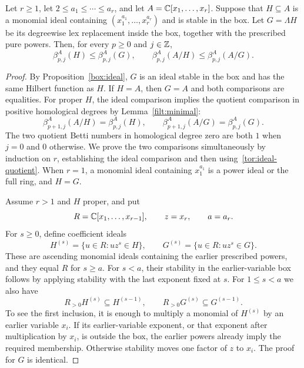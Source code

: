 \begin{theorem}
\label{tor:stable}
Let $r\ge1$, let $2\le a_1\le\cdots\le a_r$, and let
$A=\mathbb C[x_1,\ldots,x_r]$.  Suppose that $H\subseteq A$ is a
monomial ideal containing $(x_1^{a_1},\ldots,x_r^{a_r})$ and is
stable in the box.  Let $G=\Lambda H$ be its degreewise lex
replacement inside the box, together with the prescribed pure powers.
Then, for every $p\ge0$ and $j\in\mathbb Z$,
\[
 \beta^A_{p,j}(H)\le\beta^A_{p,j}(G),
 \qquad
 \beta^A_{p,j}(A/H)\le\beta^A_{p,j}(A/G).
\]
\end{theorem}

\begin{proof}
By Proposition~\ref{box:ideal}, $G$ is an ideal stable in the box
and has the same Hilbert function as $H$.  If $H=A$, then $G=A$
and both comparisons are equalities.  For proper $H$, the ideal
comparison implies the quotient comparison in positive homological
degrees by Lemma~\ref{filt:minimal}:
\begin{equation}
\label{tor:ideal-quotient}
 \beta^A_{p+1,j}(A/H)=\beta^A_{p,j}(H),
 \qquad
 \beta^A_{p+1,j}(A/G)=\beta^A_{p,j}(G).
\end{equation}
The two quotient Betti numbers in homological degree zero are both
$1$ when $j=0$ and $0$ otherwise.  We prove the two comparisons
simultaneously by induction on $r$, establishing the ideal comparison
and then using~\eqref{tor:ideal-quotient}.  When $r=1$, a monomial
ideal containing $x_1^{a_1}$ is a power ideal or the full ring, and
$H=G$.

Assume $r>1$ and $H$ proper, and put
\[
 R=\mathbb C[x_1,\ldots,x_{r-1}],\qquad z=x_r,\qquad a=a_r.
\]
For $s\ge0$, define coefficient ideals
\[
 H^{(s)}=\{u\in R:uz^s\in H\},\qquad
 G^{(s)}=\{u\in R:uz^s\in G\}.
\]
These are ascending monomial ideals containing the earlier prescribed
powers, and they equal $R$ for $s\ge a$.  For $s<a$, their
stability in the earlier-variable box follows by applying stability
with the last exponent fixed at $s$.  For $1\le s<a$ we also have
\begin{equation}
\label{tor:slice-annihilation}
 R_{>0}H^{(s)}\subseteq H^{(s-1)},\qquad
 R_{>0}G^{(s)}\subseteq G^{(s-1)}.
\end{equation}
To see the first inclusion, it is enough to multiply a monomial of
$H^{(s)}$ by an earlier variable $x_i$.  If its earlier-variable
exponent, or that exponent after multiplication by $x_i$, is outside
the box, the earlier powers already imply the required membership.
Otherwise stability moves one factor of $z$ to $x_i$.  The proof
for $G$ is identical.


\end{proof}
